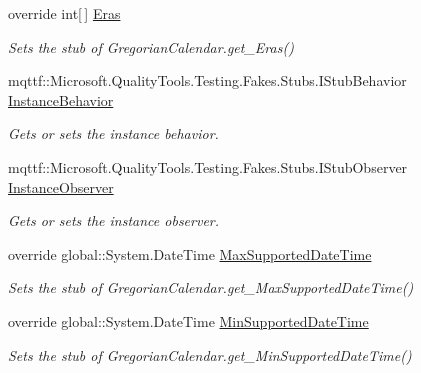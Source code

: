 \begin{DoxyCompactItemize}
override int\mbox{[}$\,$\mbox{]} \hyperlink{class_system_1_1_globalization_1_1_fakes_1_1_stub_gregorian_calendar_a9adc8bb8843e70760653451a851df18d}{Eras}
\begin{DoxyCompactList}\small\item\em Sets the stub of Gregorian\-Calendar.\-get\-\_\-\-Eras()\end{DoxyCompactList}\item 
mqttf\-::\-Microsoft.\-Quality\-Tools.\-Testing.\-Fakes.\-Stubs.\-I\-Stub\-Behavior \hyperlink{class_system_1_1_globalization_1_1_fakes_1_1_stub_gregorian_calendar_aa08b7fa40568132d21322b4e5f1ebbbb}{Instance\-Behavior}
\begin{DoxyCompactList}\small\item\em Gets or sets the instance behavior.\end{DoxyCompactList}\item 
mqttf\-::\-Microsoft.\-Quality\-Tools.\-Testing.\-Fakes.\-Stubs.\-I\-Stub\-Observer \hyperlink{class_system_1_1_globalization_1_1_fakes_1_1_stub_gregorian_calendar_a624a450a9a6ab1739f295f659f16c2ed}{Instance\-Observer}
\begin{DoxyCompactList}\small\item\em Gets or sets the instance observer.\end{DoxyCompactList}\item 
override global\-::\-System.\-Date\-Time \hyperlink{class_system_1_1_globalization_1_1_fakes_1_1_stub_gregorian_calendar_abd88e19d9d0ef5c0887cda2372b35446}{Max\-Supported\-Date\-Time}
\begin{DoxyCompactList}\small\item\em Sets the stub of Gregorian\-Calendar.\-get\-\_\-\-Max\-Supported\-Date\-Time()\end{DoxyCompactList}\item 
override global\-::\-System.\-Date\-Time \hyperlink{class_system_1_1_globalization_1_1_fakes_1_1_stub_gregorian_calendar_a03483d654e4d287b1fe7852bec74872c}{Min\-Supported\-Date\-Time}
\begin{DoxyCompactList}\small\item\em Sets the stub of Gregorian\-Calendar.\-get\-\_\-\-Min\-Supported\-Date\-Time()\end{DoxyCompactList}\item 

\end{DoxyCompactItemize}

